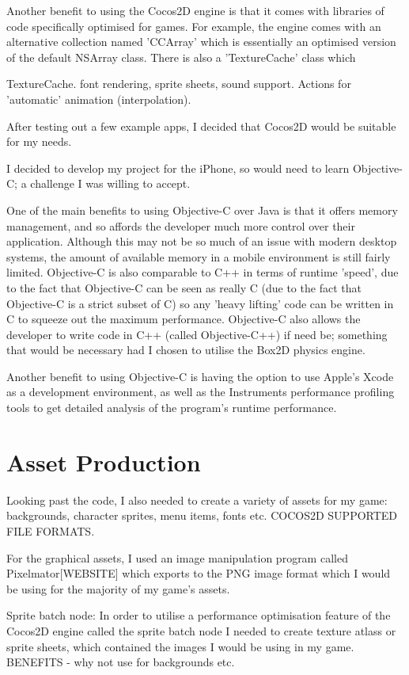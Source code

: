\documentclass[a4paper,oneside]{report}
\begin{document}
Another benefit to using the Cocos2D engine is that it comes with libraries of code specifically optimised for games. For example, the engine comes with an alternative collection named 'CCArray' which is essentially an optimised version of the default NSArray class. There is also a 'TextureCache' class which 

TextureCache. font rendering, sprite sheets, sound support. Actions for 'automatic' animation (interpolation).

After testing out a few example apps, I decided that Cocos2D would be suitable for my needs. 

I decided to develop my project for the iPhone, so would need to learn Objective-C; a challenge I was willing to accept. 

One of the main benefits to using Objective-C over Java is that it offers memory management, and so affords the developer much more control over their application. Although this may not be so much of an issue with modern desktop systems, the amount of available memory in a mobile environment is still fairly limited. Objective-C is also comparable to C++ in terms of runtime 'speed', due to the fact that Objective-C can be seen as really C (due to the fact that Objective-C is a strict subset of C) so any 'heavy lifting' code can be written in C to squeeze out the maximum performance. Objective-C also allows the developer to write code in C++ (called Objective-C++) if need be; something that would be necessary had I chosen to utilise the Box2D physics engine.

Another benefit to using Objective-C is having the option to use Apple's Xcode as a development environment, as well as the Instruments performance profiling tools to get detailed analysis of the program's runtime performance.

\section{Asset Production}

Looking past the code, I also needed to create a variety of assets for my game: backgrounds, character sprites, menu items, fonts etc. COCOS2D SUPPORTED FILE FORMATS. 

For the graphical assets, I used an image manipulation program called Pixelmator[WEBSITE] which exports to the PNG image format which I would be using for the majority of my game's assets. 

Sprite batch node: In order to utilise a performance optimisation feature of the Cocos2D engine called the sprite batch node I needed to create texture atlass or sprite sheets, which contained the images I would be using in my game. BENEFITS - why not use for backgrounds etc.
\end{document}
